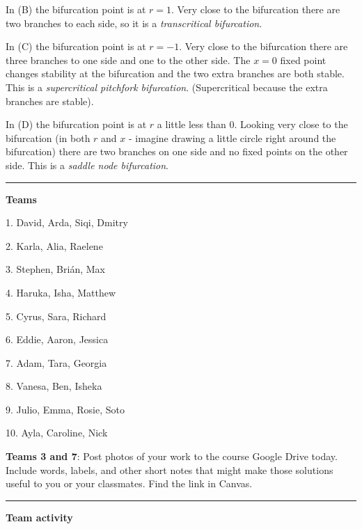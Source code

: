 \documentclass[12pt,letterpaper,noanswers]{exam}
\begin{document}
In (B) the bifurcation point is at $r = 1$.  Very close to the bifurcation there are two branches to each side, so it is a \emph{transcritical bifurcation}.

In (C) the bifurcation point is at $r = -1$.  Very close to the bifurcation there are three branches to one side and one to the other side.  The $x=0$ fixed point changes stability at the bifurcation and the two extra branches are both stable.  This is a \emph{supercritical pitchfork bifurcation}.  (Supercritical because the extra branches are stable).

In (D) the bifurcation point is at $r$ a little less than $0$.  Looking very close to the bifurcation (in both $r$ and $x$ - imagine drawing a little circle right around the bifurcation) there are two branches on one side and no fixed points on the other side.  This is a \emph{saddle node bifurcation}.

\vspace{0.2cm}

\hrule
\vspace{0.2cm}








\noindent\textbf{Teams}

\begin{multicols}{3}
1. David, Arda, Siqi, Dmitry

2. Karla, Alia, Raelene

3. Stephen, Brián, Max

4. Haruka, Isha, Matthew

5. Cyrus, Sara, Richard

6. Eddie, Aaron, Jessica

7. Adam, Tara, Georgia

8. Vanesa, Ben, Isheka

9. Julio, Emma, Rosie, Soto

10. Ayla, Caroline, Nick

\end{multicols}

\noindent \textbf{Teams 3 and 7}: Post photos of your work to the course Google Drive today.  Include words, labels, and other short notes that might make those solutions useful to you or your classmates.  Find the link in Canvas.
\vspace{0.2cm}

\hrule
\vspace{0.2cm}

\noindent\textbf{Team activity}
\end{document}
